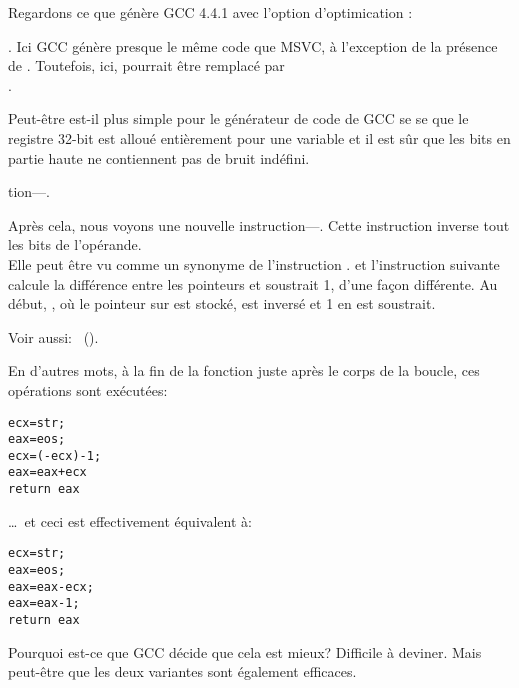 


Regardons ce que génère GCC 4.4.1 avec l'option d'optimication \Othree:



.
Ici GCC génère presque le même code que MSVC, à l'exception de la présence de \MOVZX.
Toutefois, ici, \MOVZX pourrait être remplacé par\\
.

Peut-être est-il plus simple pour le générateur de code de GCC se se 
que le registre 32-bit \EDX est alloué entièrement pour une variable \Tchar et il
est sûr que les bits en partie haute ne contiennent pas de bruit indéfini.

\label{strlen_NOT_ADD}
tion---\NOT.

Après cela, nous voyons une nouvelle instruction---\NOT. Cette instruction inverse
tout les bits de l'opérande. \\
Elle peut être vu comme un synonyme de l'instruction .
\NOT et l'instruction suivante \ADD calcule la différence entre les pointeurs et
soustrait 1, d'une façon différente.
Au début, \ECX, où le pointeur sur  est stocké, est inversé et 1 en est soustrait.

Voir aussi: \q{\SignedNumbersSectionName}~().

En d'autres mots, à la fin de la fonction juste après le corps de la boucle, ces opérations
sont exécutées:

\begin{lstlisting}[style=customc]
ecx=str;
eax=eos;
ecx=(-ecx)-1;
eax=eax+ecx
return eax
\end{lstlisting}

\dots~et ceci est effectivement équivalent à:

\begin{lstlisting}[style=customc]
ecx=str;
eax=eos;
eax=eax-ecx;
eax=eax-1;
return eax
\end{lstlisting}

Pourquoi est-ce que GCC décide que cela est mieux? Difficile à deviner.
Mais peut-être que les deux variantes sont également efficaces.
